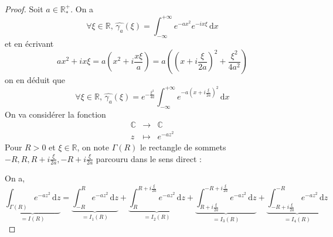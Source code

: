   \begin{proof}
    Soit $a \in \mathbb{R}^+_*$. On a
    \[ \forall \xi \in \mathbb{R}, \, \widehat{\gamma_a}(\xi) = \int_{-\infty}^{+\infty} e^{-ax^2} e^{-ix\xi} \, \mathrm{d}x \]
    et en écrivant
    \[ ax^2 + ix\xi = a \left( x^2 + i \frac{x \xi}{a} \right) = a \left( \left( x + i \frac{\xi}{2a} \right)^2 + \frac{\xi^2}{4a^2} \right) \]
    on en déduit que
    \[ \forall \xi \in \mathbb{R}, \, \widehat{\gamma_a}(\xi) = e^{-\frac{\xi^2}{4a}} \int_{-\infty}^{+\infty} e^{-a \left( x + i \frac{\xi}{2a} \right)^2} \, \mathrm{d}x \tag{$*$} \]
    On va considérer la fonction
    \[
    \begin{array}{ccc}
      \mathbb{C} &\rightarrow& \mathbb{C} \\
      z &\mapsto& e^{-az^2}
    \end{array}
    \]
    Pour $R > 0$ et $\xi \in \mathbb{R}$, on note $\Gamma(R)$ le rectangle de sommets $-R, R, R + i\frac{\xi}{2a}, -R + i\frac{\xi}{2a}$ parcouru dans le sens direct :
    \begin{center}
    \end{center}
    On a,
    \[ \underbrace{\int_{\Gamma(R)} e^{-az^2} \, \mathrm{d}z}_{= I(R)} = \underbrace{\int_{-R}^R e^{-az^2} \, \mathrm{d}z}_{= I_1(R)} + \underbrace{\int_R^{R + i\frac{\xi}{2a}} e^{-az^2} \, \mathrm{d}z}_{= I_2(R)} + \underbrace{\int_{R + i\frac{\xi}{2a}}^{-R + i\frac{\xi}{2a}} e^{-az^2} \, \mathrm{d}z}_{= I_3(R)} + \underbrace{\int_{-R + i\frac{\xi}{2a}}^{-R} e^{-az^2} \, \mathrm{d}z}_{= I_4(R)} \]

\end{proof}
